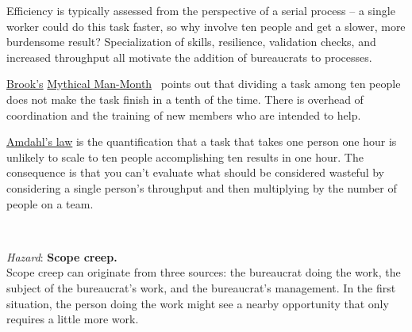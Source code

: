 Efficiency is typically assessed from the perspective of a serial process -- a single worker could do this task faster, so why involve ten people and get a slower, more burdensome result? Specialization of skills, resilience, validation checks, and increased throughput all  motivate the addition of bureaucrats to processes.

\href{https://en.wikipedia.org/wiki/Fred_Brooks}{Brook's} 
\href{https://en.wikipedia.org/wiki/The_Mythical_Man-Month}{Mythical Man-Month}~\cite{1975_brooks} points 
out that dividing a task among ten people does not make the task finish in a tenth of the time. There is overhead of coordination and the training of new members who are intended to help. 

\href{https://en.wikipedia.org/wiki/Amdahl\%27s_law}{Amdahl's law}
is the quantification that a task that takes one person one hour is unlikely to scale to ten people accomplishing ten results in one hour.
The consequence is that you can't evaluate what should be considered wasteful by considering a single person's throughput and then multiplying by the number of people on a team.





\ \\
\begin{samepage}
\textit{Hazard}: \textbf{Scope creep.}\label{sec:scope-creep} \\
Scope creep can originate from three sources: the bureaucrat doing the work, the subject of the bureaucrat's work, and the bureaucrat's management. In the first situation, the person doing the work might see a nearby opportunity that only requires a little more work. 
\end{samepage}

